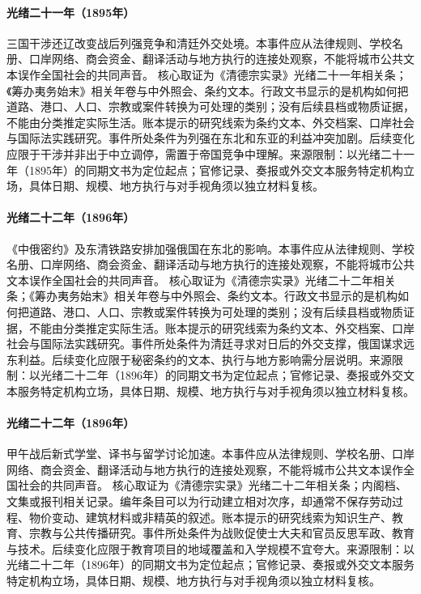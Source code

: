 \hypertarget{civic:EQ-1895-TRIPLE-INTERVENTION}{}\paragraph{光绪二十一年（1895年）}三国干涉还辽改变战后列强竞争和清廷外交处境。本事件应从法律规则、学校名册、口岸网络、商会资金、翻译活动与地方执行的连接处观察，不能将城市公共文本误作全国社会的共同声音。 核心取证为《清德宗实录》光绪二十一年相关条；《筹办夷务始末》相关年卷与中外照会、条约文本。行政文书显示的是机构如何把道路、港口、人口、宗教或案件转换为可处理的类别；没有后续县档或物质证据，不能由分类推定实际生活。账本提示的研究线索为条约文本、外交档案、口岸社会与国际法实践研究。事件所处条件为列强在东北和东亚的利益冲突加剧。后续变化应限于干涉并非出于中立调停，需置于帝国竞争中理解。来源限制：以光绪二十一年（1895年）的同期文书为定位起点；官修记录、奏报或外交文本服务特定机构立场，具体日期、规模、地方执行与对手视角须以独立材料复核。
\hypertarget{civic:EQ-1896-LI-LOBANOV-TREATY}{}\paragraph{光绪二十二年（1896年）}《中俄密约》及东清铁路安排加强俄国在东北的影响。本事件应从法律规则、学校名册、口岸网络、商会资金、翻译活动与地方执行的连接处观察，不能将城市公共文本误作全国社会的共同声音。 核心取证为《清德宗实录》光绪二十二年相关条；《筹办夷务始末》相关年卷与中外照会、条约文本。行政文书显示的是机构如何把道路、港口、人口、宗教或案件转换为可处理的类别；没有后续县档或物质证据，不能由分类推定实际生活。账本提示的研究线索为条约文本、外交档案、口岸社会与国际法实践研究。事件所处条件为清廷寻求对日后的外交支撑，俄国谋求远东利益。后续变化应限于秘密条约的文本、执行与地方影响需分层说明。来源限制：以光绪二十二年（1896年）的同期文书为定位起点；官修记录、奏报或外交文本服务特定机构立场，具体日期、规模、地方执行与对手视角须以独立材料复核。
\hypertarget{civic:EQ-1896-MODERN-EDUCATION-EXPANSION}{}\paragraph{光绪二十二年（1896年）}甲午战后新式学堂、译书与留学讨论加速。本事件应从法律规则、学校名册、口岸网络、商会资金、翻译活动与地方执行的连接处观察，不能将城市公共文本误作全国社会的共同声音。 核心取证为《清德宗实录》光绪二十二年相关条；内阁档、文集或报刊相关记录。编年条目可以为行动建立相对次序，却通常不保存劳动过程、物价变动、建筑材料或非精英的叙述。账本提示的研究线索为知识生产、教育、宗教与公共传播研究。事件所处条件为战败促使士大夫和官员反思军政、教育与技术。后续变化应限于教育项目的地域覆盖和入学规模不宜夸大。来源限制：以光绪二十二年（1896年）的同期文书为定位起点；官修记录、奏报或外交文本服务特定机构立场，具体日期、规模、地方执行与对手视角须以独立材料复核。
